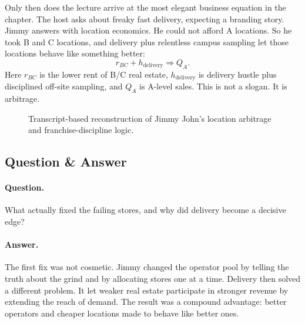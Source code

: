 Only then does the lecture arrive at the most elegant business equation in the chapter. The host asks about freaky fast delivery, expecting a branding story. Jimmy answers with location economics. He could not afford A locations. So he took B and C locations, and delivery plus relentless campus sampling let those locations behave like something better:
\begin{equation}
r_{BC}+h_{\mathrm{delivery}} \Rightarrow Q_A.
\end{equation}
Here \(r_{BC}\) is the lower rent of B/C real estate, \(h_{\mathrm{delivery}}\) is delivery hustle plus disciplined off-site sampling, and \(Q_A\) is A-level sales. This is not a slogan. It is arbitrage.

\begin{figure}[h]
\centering
{}
\caption{Transcript-based reconstruction of Jimmy John's location arbitrage and franchise-discipline logic.}
\end{figure}

\subsection{Question \& Answer}

\paragraph{Question.} What actually fixed the failing stores, and why did delivery become a decisive edge?

\paragraph{Answer.} The first fix was not cosmetic. Jimmy changed the operator pool by telling the truth about the grind and by allocating stores one at a time. Delivery then solved a different problem. It let weaker real estate participate in stronger revenue by extending the reach of demand. The result was a compound advantage: better operators and cheaper locations made to behave like better ones.

